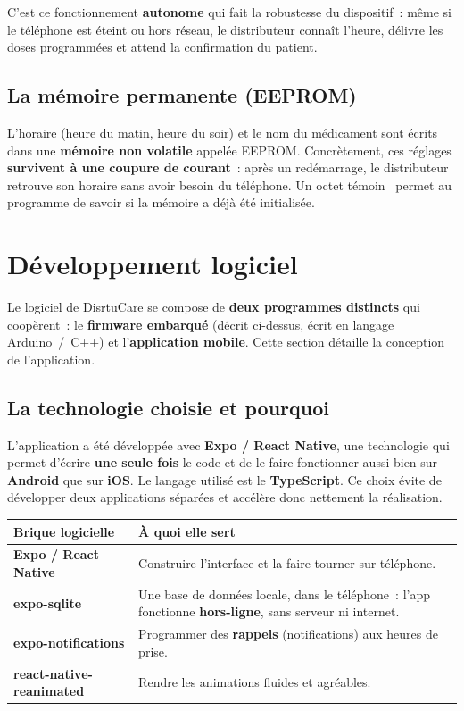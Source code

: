 \documentclass[11pt,a4paper]{report}
\begin{document}
\noindent C'est ce fonctionnement \textbf{autonome} qui fait la robustesse du dispositif~:
m\^eme si le t\'el\'ephone est \'eteint ou hors r\'eseau, le distributeur conna\^it l'heure,
d\'elivre les doses programm\'ees et attend la confirmation du patient.

\subsection{La m\'emoire permanente (EEPROM)}

L'horaire (heure du matin, heure du soir) et le nom du m\'edicament sont \'ecrits dans une
\textbf{m\'emoire non volatile} appel\'ee EEPROM. Concr\`etement, ces r\'eglages
\textbf{survivent \`a une coupure de courant}~: apr\`es un red\'emarrage, le distributeur
retrouve son horaire sans avoir besoin du t\'el\'ephone. Un \og octet t\'emoin \fg\ permet
au programme de savoir si la m\'emoire a d\'ej\`a \'et\'e initialis\'ee.

\section{D\'eveloppement logiciel}

Le logiciel de DisrtuCare se compose de \textbf{deux programmes distincts} qui coop\`erent~:
le \textbf{firmware embarqu\'e} (d\'ecrit ci-dessus, \'ecrit en langage Arduino~/~C++) et
l'\textbf{application mobile}. Cette section d\'etaille la conception de l'application.

\subsection{La technologie choisie et pourquoi}

L'application a \'et\'e d\'evelopp\'ee avec \textbf{Expo / React Native}, une technologie
qui permet d'\'ecrire \textbf{une seule fois} le code et de le faire fonctionner aussi bien
sur \textbf{Android} que sur \textbf{iOS}. Le langage utilis\'e est le \textbf{TypeScript}.
Ce choix \'evite de d\'evelopper deux applications s\'epar\'ees et acc\'el\`ere donc
nettement la r\'ealisation.

\begin{tabularx}{\linewidth}{L{4.2cm} X}
\toprule
{}\textbf{Brique logicielle} & \textbf{\`A quoi elle sert} \\
\midrule
\textbf{Expo / React Native} & Construire l'interface et la faire tourner sur t\'el\'ephone. \\
\textbf{expo-sqlite} & Une base de donn\'ees locale, dans le t\'el\'ephone~: l'app fonctionne \textbf{hors-ligne}, sans serveur ni internet. \\
\textbf{expo-notifications} & Programmer des \textbf{rappels} (notifications) aux heures de prise. \\
\textbf{react-native-reanimated} & Rendre les animations fluides et agr\'eables. \\
\bottomrule
\end{tabularx}
\end{document}
